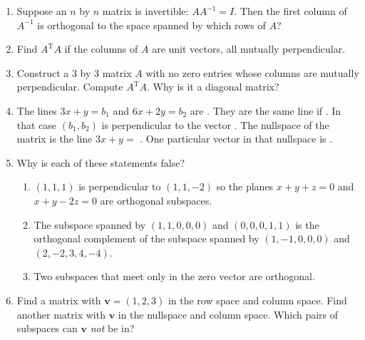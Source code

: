 \documentclass[14pt, a4paper]{article}
\begin{document}
\begin{enumerate}[resume]
    \item Suppose an $n$ by $n$ matrix is invertible: $AA^{-1} = I$. Then the first column of $A^{-1}$ is orthogonal to the space spanned by which rows of $A$?

    \item Find $A^{\mathrm{T}}A$ if the columns of $A$ are unit vectors, all mutually perpendicular.

    \item Construct a 3 by 3 matrix $A$ with no zero entries whose columns are mutually perpendicular. Compute $A^{\mathrm{T}}A$. Why is it a diagonal matrix?

    \item The lines $3x + y = b_1$ and $6x + 2y = b_2$ are \underline{\hspace{2cm}}. They are the same line if \underline{\hspace{2cm}}. In that case $(b_1, b_2)$ is perpendicular to the vector \underline{\hspace{2cm}}. The nullspace of the matrix is the line $3x + y =$ \underline{\hspace{2cm}}. One particular vector in that nullspace is \underline{\hspace{2cm}}.

    \item Why is each of these statements false?
          \begin{enumerate}
              \item $(1, 1, 1)$ is perpendicular to $(1, 1, -2)$ so the planes $x + y + z = 0$ and $x + y - 2z = 0$ are orthogonal subspaces.
              \item The subspace spanned by $(1, 1, 0, 0, 0)$ and $(0, 0, 0, 1, 1)$ is the orthogonal complement of the subspace spanned by $(1, -1, 0, 0, 0)$ and $(2, -2, 3, 4, -4)$.
              \item Two subspaces that meet only in the zero vector are orthogonal.
          \end{enumerate}

    \item Find a matrix with $\boldsymbol{v} = (1, 2, 3)$ in the row space and column space. Find another matrix with $\boldsymbol{v}$ in the nullspace and column space. Which pairs of subspaces can $\boldsymbol{v}$ \emph{not} be in?
\end{enumerate}
\end{document}
